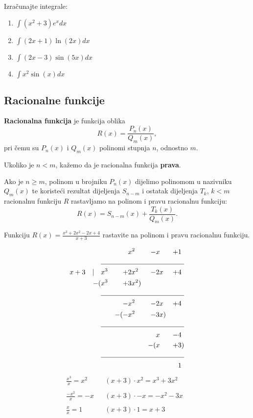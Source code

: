 \begin{example}
    Izračunajte integrale:
    \begin{enumerate}
        \item $\displaystyle \int (x^2+3)e^xdx$
        \item $\displaystyle \int (2x+1)\ln(2x)dx$
        \item $\displaystyle \int (2x-3)\sin(5x) dx$
        \item $\displaystyle \int x^2\sin(x)dx$
    \end{enumerate}
\end{example}

\subsection{Racionalne funkcije}

\textbf{Racionalna funkcija} je funkcija oblika
$$
R(x) = \frac{P_n(x)}{Q_m(x)},
$$
pri čemu su $P_n(x)$ i $Q_m(x)$ polinomi stupnja $n$, odnostno $m$.

Ukoliko je $n < m$, kažemo da je racionalna funkcija \textbf{prava}.

Ako je $n \geq m$, polinom u brojniku $P_n(x)$ dijelimo polinomom u nazivniku
$Q_m(x)$ te koristeći rezultat dijeljenja $S_{n-m}$ i ostatak dijeljenja $T_k$,
$k<m$ racionalnu funkciju $R$ rastavljamo na polinom i pravu racionalnu
funkciju:
$$
R(x) = S_{n-m}(x) + \frac{T_k(x)}{Q_m(x)}.
$$

\begin{example}
    Funkciju $R(x)=\frac{x^3+2x^2-2x+4}{x+3}$ rastavite na polinom i pravu
    racionalnu funkciju.
\end{example}

\begin{multicols}{2}
\begin{alignat*}{9}
                &&& x^2 &-& x &+& 1\\
                \cline{2-9}
x+3 \quad|\quad &x^3 &+& 2x^2 &-& 2x &+& 4 \\
                -(&x^3 &+& 3x^2)\\
                \cline{2-9}
                && -&x^2 &-&2x &+& 4 \\
                && -(-&x^2 &-& 3x) \\
                \cline{2-9}
                &&&&&x &-& 4\\
                &&&&-(&x &+& 3)\\
                \cline{2-9}
                &&&&&&&1
\end{alignat*}
\columnbreak
{}
\begin{align*}
    \frac{x^3}{x} = \boxed{x^2}&&(x+3)\cdot x^2 = \boxed{x^3 + 3x^2}&\\\\
    \frac{-x^2}{x} = \boxed{-x}&&(x+3)\cdot -x = \boxed{-x^2 - 3x}&\\\\
    \frac{x}{x} = \boxed{1}&&(x+3)\cdot 1 = \boxed{x+3}&\\
\end{align*}
\end{multicols}

